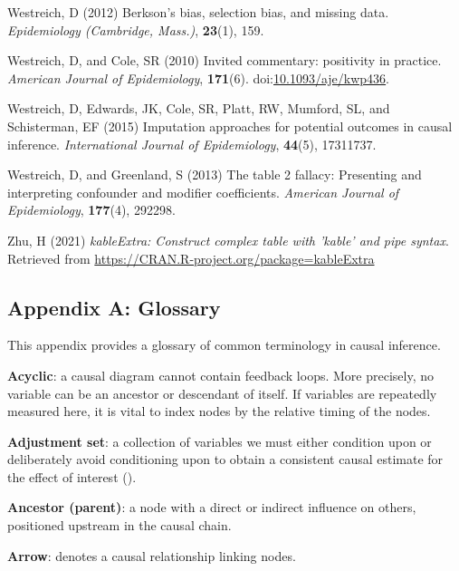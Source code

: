 \documentclass[
  singlecolumn]{article}
\newlength{\cslhangindent}
\newenvironment{CSLReferences}[2] %
 {\begin{list}{}{%
  \setlength{\itemindent}{0pt}
  \setlength{\leftmargin}{0pt}
  \setlength{\parsep}{0pt}
  \ifodd #1
   \setlength{\leftmargin}{\cslhangindent}
   \setlength{\itemindent}{-1\cslhangindent}
  \fi
  \setlength{\itemsep}{#2\baselineskip}}}
 {\end{list}}
\begin{document}
\begin{CSLReferences}{1}{0}
Westreich, D (2012) Berkson's bias, selection bias, and missing data.
\emph{Epidemiology (Cambridge, Mass.)}, \textbf{23}(1), 159.

Westreich, D, and Cole, SR (2010) Invited commentary: positivity in
practice. \emph{American Journal of Epidemiology}, \textbf{171}(6).
doi:\href{https://doi.org/10.1093/aje/kwp436}{10.1093/aje/kwp436}.

Westreich, D, Edwards, JK, Cole, SR, Platt, RW, Mumford, SL, and
Schisterman, EF (2015) Imputation approaches for potential outcomes in
causal inference. \emph{International Journal of Epidemiology},
\textbf{44}(5), 17311737.

Westreich, D, and Greenland, S (2013) The table 2 fallacy: Presenting
and interpreting confounder and modifier coefficients. \emph{American
Journal of Epidemiology}, \textbf{177}(4), 292298.

Zhu, H (2021) \emph{kableExtra: Construct complex table with 'kable' and
pipe syntax}. Retrieved from
\url{https://CRAN.R-project.org/package=kableExtra}

\end{CSLReferences}

\newpage{}

\subsection{Appendix A: Glossary}\label{appendix-a}

This appendix provides a glossary of common terminology in causal
inference.

\textbf{Acyclic}: a causal diagram cannot contain feedback loops. More
precisely, no variable can be an ancestor or descendant of itself. If
variables are repeatedly measured here, it is vital to index nodes by
the relative timing of the nodes.

\textbf{Adjustment set}: a collection of variables we must either
condition upon or deliberately avoid conditioning upon to obtain a
consistent causal estimate for the effect of interest
().

\textbf{Ancestor (parent)}: a node with a direct or indirect influence
on others, positioned upstream in the causal chain.

\textbf{Arrow}: denotes a causal relationship linking nodes.
\end{document}
